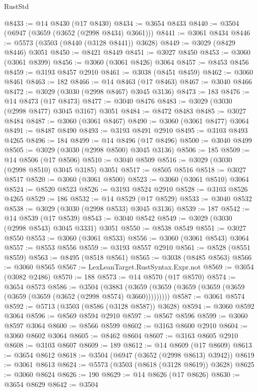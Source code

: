 \begin{lexlean}{RustStd}
\begin{coremodule}
@8433 := @14 @8430 (@17 @8430)
@8434 := @3654 @8433
@8440 := @3504 (@6947 (@3659 (@3652 (@2998 @8434) @3661)))
@8441 := @3061 @8434
@8446 := @5573 (@3503 (@8440 (@3128 @8441)) @3628)
@8449 := @3029 (@8429 @8446) @3051
@8450 := @8421 @8449
@8451 := @3027 @8450
@8453 := @3060 (@3061 @8399)
@8456 := @3060 (@3061 @8426) @3064
@8457 := @8453 @8456
@8459 := @3193 @8457 @2910
@8461 := @3038 (@8451 @8459)
@8462 := @3060 @8461
@8463 := 182
@8466 := @14 @8463 (@17 @8463)
@8467 := @3040 @8466
@8472 := @3029 (@3030 (@2998 @8467) @3045 @3136)
@8473 := 183
@8476 := @14 @8473 (@17 @8473)
@8477 := @3040 @8476
@8483 := @3029 (@3030 (@2998 @8477) @3045 @3167) @3051
@8484 := @8472 @8483
@8485 := @3027 @8484
@8487 := @3060 (@3061 @8467)
@8490 := @3060 (@3061 @8477) @3064
@8491 := @8487 @8490
@8493 := @3193 @8491 @2910
@8495 := @3103 @8493 @4265
@8496 := 184
@8499 := @14 @8496 (@17 @8496)
@8500 := @3040 @8499
@8505 := @3029 (@3030 (@2998 @8500) @3045 @3136)
@8506 := 185
@8509 := @14 @8506 (@17 @8506)
@8510 := @3040 @8509
@8516 := @3029 (@3030 (@2998 @8510) @3045 @3185) @3051
@8517 := @8505 @8516
@8518 := @3027 @8517
@8520 := @3060 (@3061 @8500)
@8523 := @3060 (@3061 @8510) @3064
@8524 := @8520 @8523
@8526 := @3193 @8524 @2910
@8528 := @3103 @8526 @4265
@8529 := 186
@8532 := @14 @8529 (@17 @8529)
@8533 := @3040 @8532
@8538 := @3029 (@3030 (@2998 @8533) @3045 @3136)
@8539 := 187
@8542 := @14 @8539 (@17 @8539)
@8543 := @3040 @8542
@8549 := @3029 (@3030 (@2998 @8543) @3045 @3331) @3051
@8550 := @8538 @8549
@8551 := @3027 @8550
@8553 := @3060 (@3061 @8533)
@8556 := @3060 (@3061 @8543) @3064
@8557 := @8553 @8556
@8559 := @3193 @8557 @2910
@8561 := @8528 (@8551 @8559)
@8563 := @8495 (@8518 @8561)
@8565 := @3038 (@8485 @8563)
@8566 := @3060 @8565
@8567 := LexLeanTarget.RustSyntax.Expr.not
@8569 := @3054 (@3082 @2486)
@8570 := 188
@8573 := @14 @8570 (@17 @8570)
@8574 := @3654 @8573
@8586 := @3504
    (@3883 (@3659 (@3659 (@3659 (@3659 (@3659 (@3659 (@3659 (@3652 (@2998 @8574) @3660)))))))))
@8587 := @3061 @8574
@8592 := @5713 (@3503 (@8586 (@3128 @8587)) @3628)
@8594 := @3060 @8592 @3064
@8596 := @8569 @8594 @2910
@8597 := @8567 @8596
@8599 := @3060 @8597 @3064
@8600 := @8566 @8599
@8602 := @3163 @8600 @2910
@8604 := @3060 @8602 @3064
@8605 := @8462 @8604
@8607 := @3163 @8605 @2910
@8608 := @3103 @8607
@8609 := 189
@8612 := @14 @8609 (@17 @8609)
@8613 := @3654 @8612
@8618 := @3504 (@6947 (@3652 (@2998 @8613) @3942))
@8619 := @3061 @8613
@8624 := @5573 (@3503 (@8618 (@3128 @8619)) @3628)
@8625 := @3060 @8624
@8626 := 190
@8629 := @14 @8626 (@17 @8626)
@8630 := @3654 @8629
@8642 := @3504

\end{coremodule}
\end{lexlean}
